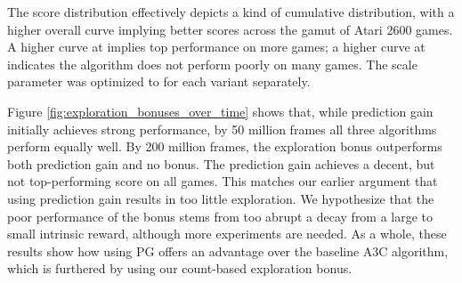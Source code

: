 \documentclass{article}
\begin{document}
{The score distribution effectively depicts a kind of cumulative distribution, with a higher overall curve implying better scores across the gamut of Atari 2600 games. A higher curve at  implies top performance on more games; a higher curve at  indicates the algorithm does not perform poorly on many games. The scale parameter  was optimized to  for each variant separately. 

Figure \ref{fig:exploration_bonuses_over_time} shows that, while prediction gain initially achieves strong performance, by 50 million frames all three algorithms perform equally well. By 200 million frames, the  exploration bonus outperforms both prediction gain and no bonus. The prediction gain achieves a decent, but not top-performing score on all games. This matches our earlier argument that using prediction gain results in too little exploration. We hypothesize that the poor performance of the  bonus stems from too abrupt a decay from a large to small intrinsic reward, although more experiments are needed. 
As a whole, these results show how using PG offers an advantage over the baseline A3C algorithm, which is furthered by using our count-based exploration bonus.
\begin{figure*}
\caption{Inter-algorithm score distribution for exploration bonus variants. 
For all methods the point  is omitted for clarity. See text for details.\label{fig:exploration_bonuses_over_time}} 
\end{figure*}

\begin{table}
\end{table}}
\end{document}
